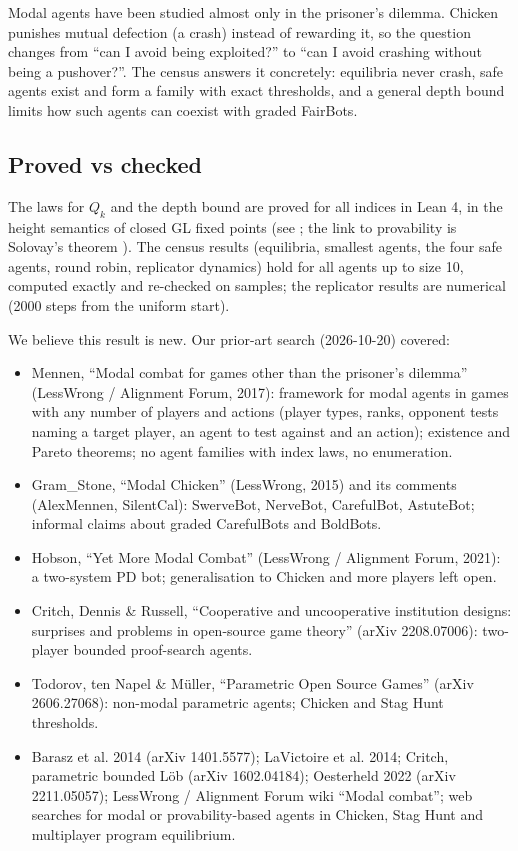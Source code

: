 \documentclass{article}
\begin{document}
Modal agents have been studied almost only in the prisoner's dilemma. Chicken punishes mutual
defection (a crash) instead of rewarding it, so the question changes from ``can I avoid being
exploited?'' to ``can I avoid crashing without being a pushover?''. The census answers it
concretely: equilibria never crash, safe agents exist and form a family with exact thresholds, and
a general depth bound limits how such agents can coexist with graded FairBots.

\subsection*{Proved vs checked}

The laws for $Q_k$ and the depth bound are proved for all indices in Lean 4, in the height
semantics of closed GL fixed points (see \cite{boolos1993logic}; the link to provability is Solovay's
theorem \cite{solovay1976provability}). The census results (equilibria, smallest agents, the four safe
agents, round robin, replicator dynamics) hold for all agents up to size 10, computed exactly and
re-checked on samples; the replicator results are numerical (2000 steps from the uniform start).

We believe this result is new. Our prior-art search (2026-10-20) covered:

\begin{itemize}
\item Mennen, ``Modal combat for games other than the prisoner's dilemma'' (LessWrong / Alignment Forum, 2017): framework for modal agents in games with any number of players and actions (player types, ranks, opponent tests naming a target player, an agent to test against and an action); existence and Pareto theorems; no agent families with index laws, no enumeration.
\item Gram\_Stone, ``Modal Chicken'' (LessWrong, 2015) and its comments (AlexMennen, SilentCal): SwerveBot, NerveBot, CarefulBot, AstuteBot; informal claims about graded CarefulBots and BoldBots.
\item Hobson, ``Yet More Modal Combat'' (LessWrong / Alignment Forum, 2021): a two-system PD bot; generalisation to Chicken and more players left open.
\item Critch, Dennis \& Russell, ``Cooperative and uncooperative institution designs: surprises and problems in open-source game theory'' (arXiv 2208.07006): two-player bounded proof-search agents.
\item Todorov, ten Napel \& Müller, ``Parametric Open Source Games'' (arXiv 2606.27068): non-modal parametric agents; Chicken and Stag Hunt thresholds.
\item Barasz et al. 2014 (arXiv 1401.5577); LaVictoire et al. 2014; Critch, parametric bounded Löb (arXiv 1602.04184); Oesterheld 2022 (arXiv 2211.05057); LessWrong / Alignment Forum wiki ``Modal combat''; web searches for modal or provability-based agents in Chicken, Stag Hunt and multiplayer program equilibrium.
\end{itemize}
\end{document}
